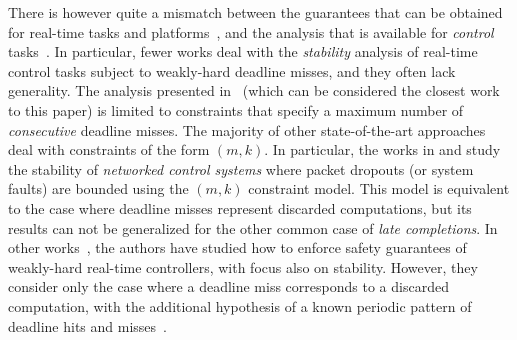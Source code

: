 There is however quite a mismatch between the guarantees that can be obtained for real-time tasks and platforms~\cite{Hammadeh:2017b, Hammadeh:2019, choi2019job, pazzaglia2020generalized}, and the analysis that is available for \emph{control} tasks~\cite{Pazzaglia:2018, Maggio:2020}.
In particular, fewer works deal with the \emph{stability} analysis of real-time control tasks subject to weakly-hard deadline misses, and they often lack generality. 
The analysis presented in~\cite{Maggio:2020} (which can be considered the closest work to this paper) is limited to constraints that specify a maximum number of \emph{consecutive} deadline misses.
The majority of other state-of-the-art approaches deal with constraints of the form $(m,k)$.
In particular, the works in \cite{Linsenmayer:2017} and \cite{linsenmayer2020linear} study the stability of \emph{networked control systems} where packet dropouts (or system faults) are bounded using the $(m,k)$ constraint model.
This model is equivalent to the case where deadline misses represent discarded computations, but its results can not be generalized for the other common case of \emph{late completions}.
In other works~\cite{huang2019exploring,liang2019security,liang2020leveraging}, the authors have studied how to enforce safety guarantees of weakly-hard real-time controllers, with focus also on stability. However, they consider only the case where a deadline miss corresponds to a discarded computation, with the additional hypothesis of a known periodic pattern of deadline hits and misses~\cite{liang2019security,liang2020leveraging}.

